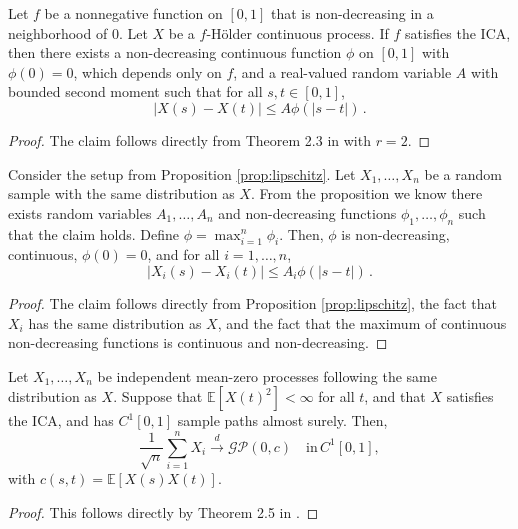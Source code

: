 \begin{proposition}\label{prop:lipschitz}
    Let $f$ be a nonnegative function on $[0, 1]$ that is non-decreasing in a neighborhood of $0$.
    Let $X$ be a $f$-H\"older continuous process. If $f$ satisfies the ICA, then there exists a
    non-decreasing continuous function $\phi$ on $[0, 1]$ with $\phi(0) = 0$, which depends only on
    $f$, and a real-valued random variable $A$ with bounded second moment such that for all $s, t
    \in [0, 1]$,
    \[
        |X(s) - X(t)| \leq A \phi(|s - t|) \,.
    \]
\end{proposition}
\begin{proof}
    The claim follows directly from Theorem 2.3 in \cite{hahn1977} with $r = 2$.
\end{proof}

\begin{corollary}\label{cor:lipschitz}
    Consider the setup from Proposition \ref{prop:lipschitz}. Let $X_1, \dots, X_n$ be a random
    sample with the same distribution as $X$. From the proposition we know there exists random
    variables $A_1, \dots, A_n$ and non-decreasing functions $\phi_1, \dots, \phi_n$ such that the
    claim holds. Define $\phi = \max_{i = 1}^n \phi_i$. Then, $\phi$ is non-decreasing, continuous,
    $\phi(0) = 0$, and for all $i = 1, \dots, n$,
    \[
        |X_i(s) - X_i(t)| \leq A_i \phi(|s - t|) \,.
    \]
\end{corollary}
\begin{proof}
    The claim follows directly from Proposition \ref{prop:lipschitz}, the fact that $X_i$ has the
    same distribution as $X$, and the fact that the maximum of continuous non-decreasing functions
    is continuous and non-decreasing.
\end{proof}


\begin{theorem}\label{thm:fclt}
    Let $X_1, \dots, X_n$ be independent mean-zero processes following the same distribution as $X$.
    Suppose that $\mathbb{E}[X(t)^2] < \infty$ for all $t$, and that $X$ satisfies the ICA, and has
    $C^1[0, 1]$ sample paths almost surely. Then,
    \[
        \frac{1}{\sqrt{n}} \sum_{i = 1}^n X_i \overset{d}{\to} \mathcal{GP}(0, c)
        \quad \text{in} \, C^1[0, 1],
    \]
    with $c(s, t) = \mathbb{E}[X(s) X(t)]$.
\end{theorem}
\begin{proof}
    This follows directly by Theorem 2.5 in \cite{hahn1977}.
\end{proof}


